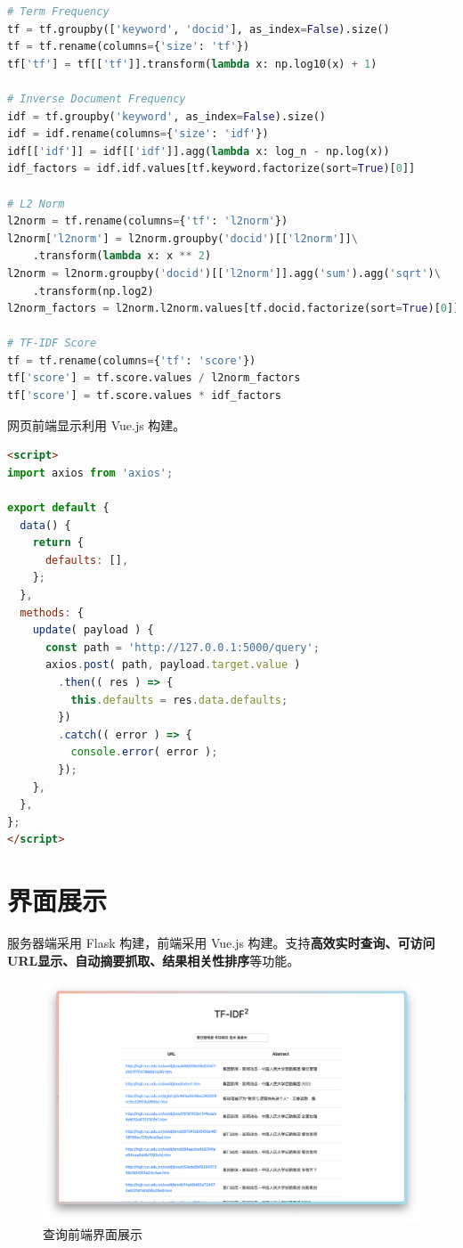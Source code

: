 \documentclass{ctexart}
\begin{document}
\begin{lstlisting}[language=Python]
# Term Frequency
tf = tf.groupby(['keyword', 'docid'], as_index=False).size()
tf = tf.rename(columns={'size': 'tf'})
tf['tf'] = tf[['tf']].transform(lambda x: np.log10(x) + 1)

# Inverse Document Frequency
idf = tf.groupby('keyword', as_index=False).size()
idf = idf.rename(columns={'size': 'idf'})
idf[['idf']] = idf[['idf']].agg(lambda x: log_n - np.log(x))
idf_factors = idf.idf.values[tf.keyword.factorize(sort=True)[0]]

# L2 Norm
l2norm = tf.rename(columns={'tf': 'l2norm'})
l2norm['l2norm'] = l2norm.groupby('docid')[['l2norm']]\
    .transform(lambda x: x ** 2)
l2norm = l2norm.groupby('docid')[['l2norm']].agg('sum').agg('sqrt')\
    .transform(np.log2)
l2norm_factors = l2norm.l2norm.values[tf.docid.factorize(sort=True)[0]]

# TF-IDF Score
tf = tf.rename(columns={'tf': 'score'})
tf['score'] = tf.score.values / l2norm_factors
tf['score'] = tf.score.values * idf_factors
\end{lstlisting}

网页前端显示利用 Vue.js 构建。

\begin{lstlisting}[language=HTML]
<script>
import axios from 'axios';

export default {
  data() {
    return {
      defaults: [],
    };
  },
  methods: {
    update( payload ) {
      const path = 'http://127.0.0.1:5000/query';
      axios.post( path, payload.target.value )
        .then(( res ) => {
          this.defaults = res.data.defaults;
        })
        .catch(( error ) => {
          console.error( error );
        });
    },
  },
};
</script>

\end{lstlisting}



\section{界面展示}

服务器端采用 Flask 构建，前端采用 Vue.js 构建。支持\textbf{高效实时查询、可访问URL显示、自动摘要抓取、结果相关性排序}等功能。

\begin{figure}[h]
	\centering
	\includegraphics[width=0.9\columnwidth]{webui.png}
	\caption{查询前端界面展示}
\end{figure}
\end{document}
